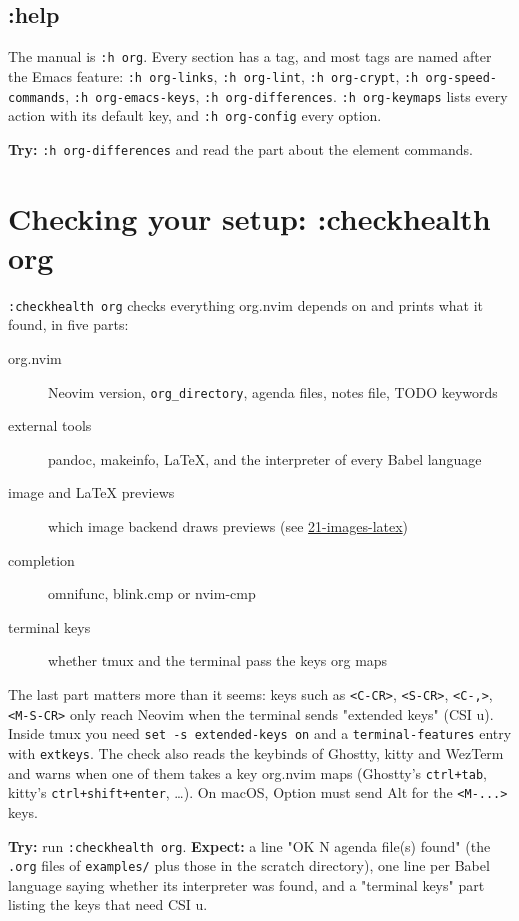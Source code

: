 \subsection{:help}
\label{sec:orge87d85b}
The manual is \texttt{:h org}. Every section has a tag, and most tags are named
after the Emacs feature: \texttt{:h org-links}, \texttt{:h org-lint}, \texttt{:h org-crypt},
\texttt{:h org-speed-commands}, \texttt{:h org-emacs-keys}, \texttt{:h org-differences}.
\texttt{:h org-keymaps} lists every action with its default key, and
\texttt{:h org-config} every option.

\textbf{Try:} \texttt{:h org-differences} and read the part about the element commands.
\section{Checking your setup: :checkhealth org}
\label{sec:org9a91767}
\texttt{:checkhealth org} checks everything org.nvim depends on and prints what
it found, in five parts:

\begin{description}
\item[{org.nvim}] Neovim version, \texttt{org\_directory}, agenda files, notes file, TODO
keywords
\item[{external tools}] pandoc, makeinfo, \LaTeX{}, and the interpreter of every
Babel language
\item[{image and \LaTeX{} previews}] which image backend draws previews (see
\href{21-images-latex.org}{21-images-latex})
\item[{completion}] omnifunc, blink.cmp or nvim-cmp
\item[{terminal keys}] whether tmux and the terminal pass the keys org maps
\end{description}

The last part matters more than it seems: keys such as \texttt{<C-CR>}, \texttt{<S-CR>},
\texttt{<C-,>}, \texttt{<M-S-CR>} only reach Neovim when the terminal sends "extended
keys" (CSI u). Inside tmux you need \texttt{set -s extended-keys on} and a
\texttt{terminal-features} entry with \texttt{extkeys}. The check also reads the
keybinds of Ghostty, kitty and WezTerm and warns when one of them takes a
key org.nvim maps (Ghostty's \texttt{ctrl+tab}, kitty's \texttt{ctrl+shift+enter}, \ldots{}).
On macOS, Option must send Alt for the \texttt{<M-...>} keys.

\textbf{Try:} run \texttt{:checkhealth org}.
\textbf{Expect:} a line "OK N agenda file(s) found" (the \texttt{.org} files of
\texttt{examples/} plus those in the scratch directory), one line per Babel
language saying whether its interpreter was found, and a "terminal keys"
part listing the keys that need CSI u.

